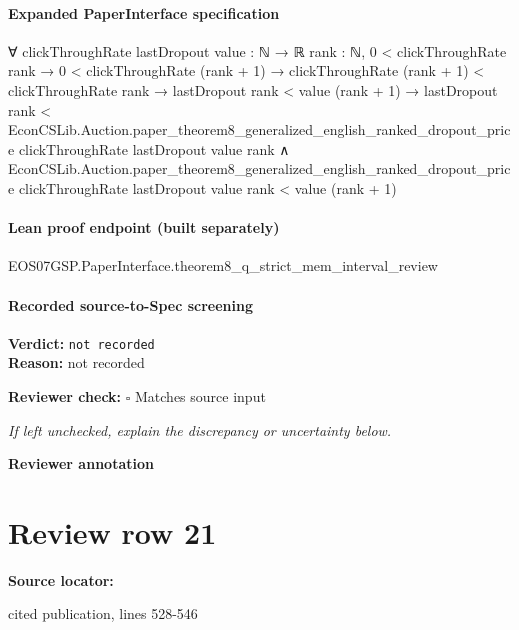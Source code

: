 \documentclass[10pt]{article}
\newcommand{\reviewerbox}{%
  \par\noindent\fbox{\parbox{0.96\linewidth}{\rule{0pt}{0.38in}}}\par
}
\newcommand{\reviewmatch}[1]{%
  \par\noindent\textbf{Reviewer check:} $\square$\; #1\par
  \noindent\emph{If left unchecked, explain the discrepancy or uncertainty below.}\par
}
\begin{document}
\paragraph{Expanded PaperInterface specification}
\begin{ReviewVerbatim}
∀ {clickThroughRate lastDropout value : ℕ → ℝ} {rank : ℕ},
  0 < clickThroughRate rank →
    0 < clickThroughRate (rank + 1) →
      clickThroughRate (rank + 1) < clickThroughRate rank →
        lastDropout rank < value (rank + 1) →
          lastDropout rank <
              EconCSLib.Auction.paper_theorem8_generalized_english_ranked_dropout_price clickThroughRate lastDropout
                value rank ∧
            EconCSLib.Auction.paper_theorem8_generalized_english_ranked_dropout_price clickThroughRate lastDropout value
                rank <
              value (rank + 1)
\end{ReviewVerbatim}

\paragraph{Lean proof endpoint (built separately)}\begin{ReviewVerbatim}
EOS07GSP.PaperInterface.theorem8_q_strict_mem_interval_review
\end{ReviewVerbatim}

\paragraph{Recorded source-to-Spec screening}
\textbf{Verdict:} \texttt{not recorded}
\\
\textbf{Reason:} not recorded
\reviewmatch{Matches source input}
\noindent\textbf{Reviewer annotation}\par
\reviewerbox
\clearpage
\hypertarget{source-claim-c988f66a79a55c91}{}
\section*{Review row 21}
\textbf{Source locator:} {\footnotesize\raggedright cited publication, lines 528-\allowbreak{}546\par}
\end{document}
